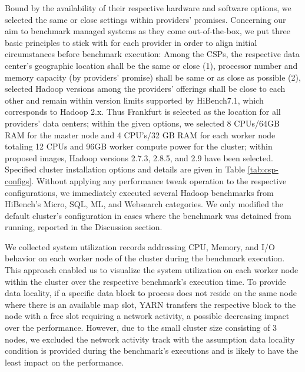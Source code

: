 \documentclass[review]{elsarticle}
\begin{document}
Bound by the availability of their respective hardware and software options, we selected the same or close settings within providers' promises. Concerning our aim to benchmark managed systems as they come out-of-the-box, we put three basic principles to stick with for each provider in order to align initial circumstances before benchmark execution: Among the CSPs, the respective data center's geographic location shall be the same or close (1), processor number and memory capacity (by providers' promise) shall be same or as close as possible (2), selected Hadoop versions among the providers' offerings shall be close to each other and remain within version limits supported by HiBench7.1, which corresponds to Hadoop 2.x. Thus Frankfurt is selected as the location for all providers' data centers; within the given options, we selected 8 CPUs/64GB RAM for the master node and 4 CPU's/32 GB RAM for each worker node totaling 12 CPUs and 96GB worker compute power for the cluster; within proposed images, Hadoop versions 2.7.3, 2.8.5, and 2.9 have been selected. Specified cluster installation options and details are given in Table \ref{tab:csp-configs}. Without applying any performance tweak operation to the respective configurations, we immediately executed several Hadoop benchmarks from HiBench's Micro, SQL, ML, and Websearch categories. We only modified the default cluster's configuration in cases where the benchmark was detained from running, reported in the Discussion section.

We collected system utilization records addressing CPU, Memory, and I/O behavior on each worker node of the cluster during the benchmark execution. This approach enabled us to visualize the system utilization on each worker node within the cluster over the respective benchmark's execution time. To provide data locality, if a specific data block to process does not reside on the same node where there is an available map slot, YARN transfers the respective block to the node with a free slot requiring a network activity, a possible decreasing impact over the performance. However, due to the small cluster size consisting of 3 nodes, we excluded the network activity track with the assumption data locality condition is provided during the benchmark's executions and is likely to have the least impact on the performance.
\end{document}
